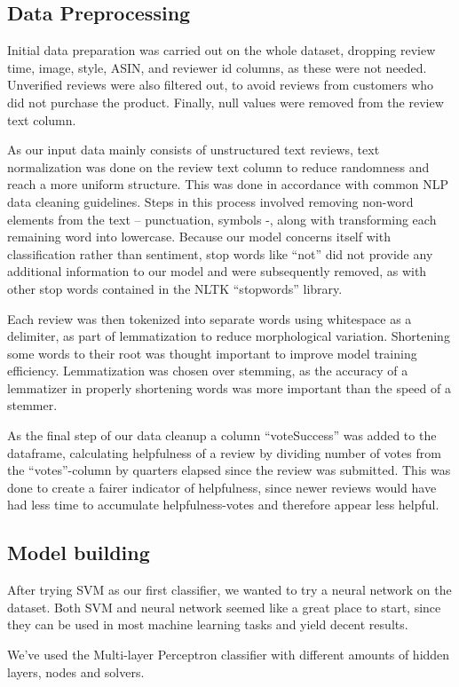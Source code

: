 \documentclass[twoside,twocolumn]{article}
\begin{document}
\subsection{Data Preprocessing}
Initial data preparation was carried out on the whole dataset, dropping review time, image, style, ASIN, and reviewer id columns, as these were not needed. Unverified reviews were also filtered out, to avoid reviews from customers who did not purchase the product. Finally, null values were removed from the review text column.

As our input data mainly consists of unstructured text reviews, text normalization was done on the review text column to reduce randomness and reach a more uniform structure. This was done in accordance with common NLP data cleaning guidelines. Steps in this process involved removing non-word elements from the text – punctuation, symbols -, along with transforming each remaining word into lowercase. Because our model concerns itself with classification rather than sentiment, stop words like “not” did not provide any additional information to our model and were subsequently removed, as with other stop words contained in the NLTK “stopwords” library.

Each review was then tokenized into separate words using whitespace as a delimiter, as part of lemmatization to reduce morphological variation. Shortening some words to their root was thought important to improve model training efficiency. Lemmatization was chosen over stemming, as the accuracy of a lemmatizer in properly shortening words was more important than the speed of a stemmer.

As the final step of our data cleanup a column “voteSuccess” was added to the dataframe, calculating helpfulness of a review by dividing number of votes from the “votes”-column by quarters elapsed since the review was submitted. This was done to create a fairer indicator of helpfulness, since newer reviews would have had less time to accumulate helpfulness-votes and therefore appear less helpful.


\subsection{Model building}
After trying SVM as our first classifier, we wanted to try a neural network on the dataset. Both SVM and neural network seemed like a great place to start, since they can be used in most machine learning tasks and yield decent results.

We've used the Multi-layer Perceptron classifier with different amounts of hidden layers, nodes and solvers.
\end{document}
